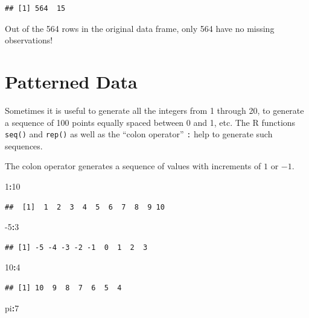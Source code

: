 \documentclass[
]{krantz}
\newenvironment{Shaded}{\begin{snugshade}}{\end{snugshade}}
\newcommand{\DecValTok}[1]{\textcolor[rgb]{0.00,0.00,0.81}{#1}}
\newcommand{\NormalTok}[1]{#1}
\newcommand{\OperatorTok}[1]{\textcolor[rgb]{0.81,0.36,0.00}{\textbf{#1}}}
\begin{document}
\begin{verbatim}
## [1] 564  15
\end{verbatim}

Out of the 564 rows in the original data frame, only 564 have no missing observations!

\hypertarget{patterned-data}{%
\section{Patterned Data}\label{patterned-data}}

Sometimes it is useful to generate all the integers from 1 through 20, to generate a sequence of 100 points equally spaced between 0 and 1, etc. The R functions \texttt{seq()} and \texttt{rep()} as well as the ``colon operator'' \texttt{:} help to generate such sequences.

The colon operator generates a sequence of values with increments of \(1\) or \(-1\).

\begin{Shaded}
\begin{Highlighting}[]
\DecValTok{1}\OperatorTok{:}\DecValTok{10}
\end{Highlighting}
\end{Shaded}

\begin{verbatim}
##  [1]  1  2  3  4  5  6  7  8  9 10
\end{verbatim}

\begin{Shaded}
\begin{Highlighting}[]
\DecValTok{{-}5}\OperatorTok{:}\DecValTok{3}
\end{Highlighting}
\end{Shaded}

\begin{verbatim}
## [1] -5 -4 -3 -2 -1  0  1  2  3
\end{verbatim}

\begin{Shaded}
\begin{Highlighting}[]
\DecValTok{10}\OperatorTok{:}\DecValTok{4}
\end{Highlighting}
\end{Shaded}

\begin{verbatim}
## [1] 10  9  8  7  6  5  4
\end{verbatim}

\begin{Shaded}
\begin{Highlighting}[]
\NormalTok{pi}\OperatorTok{:}\DecValTok{7}
\end{Highlighting}
\end{Shaded}
\end{document}

